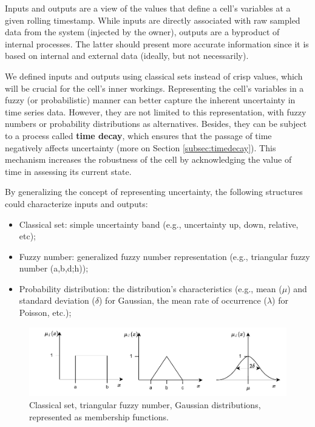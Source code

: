 Inputs and outputs are a view of the values that define a cell's variables at a given rolling timestamp. While inputs are directly associated with raw sampled data from the system (injected by the owner), outputs are a byproduct of internal processes. The latter should present more accurate information since it is based on internal and external data (ideally, but not necessarily).

We defined inputs and outputs using classical sets instead of crisp values, which will be crucial for the cell's inner workings. Representing the cell's variables in a fuzzy (or probabilistic) manner can better capture the inherent uncertainty in time series data. However, they are not limited to this representation, with fuzzy numbers or probability distributions as alternatives. Besides, they can be subject to a process called \textbf{time decay}, which ensures that the passage of time negatively affects uncertainty (more on Section \ref{subsec:timedecay}). This mechanism increases the robustness of the cell by acknowledging the value of time in assessing its current state.

By generalizing the concept of representing uncertainty, the following structures could characterize inputs and outputs:

\begin{itemize}
    \item Classical set: simple uncertainty band (e.g., uncertainty up, down, relative, etc);
    \item Fuzzy number: generalized fuzzy number representation \cite{Zhang2019} (e.g., triangular fuzzy number (a,b,d;h));
    \item Probability distribution: the distribution's characteristics (e.g., mean ($\mu$) and standard deviation ($\delta$) for Gaussian, the mean rate of occurrence ($\lambda$) for Poisson, etc.);
\end{itemize}

\begin{figure}[h!]
    \centering
    \includegraphics[width=15cm]{figures/chapter4/cell/classic_fuzzy_gaussian.pdf}
    \caption{Classical set, triangular fuzzy number, Gaussian distributions, represented as membership functions.}
    \label{fig:classicfuzzygaussian}
\end{figure}

